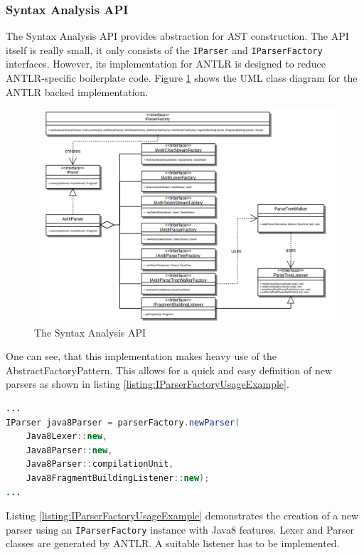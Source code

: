 \subsubsection{Syntax Analysis API}
\label{subsubsection:SyntaxAnalysisAPI}
The Syntax Analysis \gls{API} provides abstraction for \gls{AST} construction.
The \gls{API} itself is really small, it only consists of the \texttt{IParser} and \texttt{IParserFactory} interfaces.
However, its implementation for \gls{ANTLR} is designed to reduce \gls{ANTLR}-specific boilerplate code.
Figure \ref{figure:SyntaxAnalysisAPI} shows the \gls{UML} class diagram for the \gls{ANTLR} backed implementation.
\begin{figure}[h!]
\begin{center}
\includegraphics[width=\textwidth]{images/SyntaxAnalysisAPI.png}
\end{center}
\caption{The Syntax Analysis API}
\label{figure:SyntaxAnalysisAPI}
\end{figure}
One can see, that this implementation makes heavy use of the \gls{AbstractFactoryPattern}.
This allows for a quick and easy definition of new parsers as shown in listing \ref{listing:IParserFactoryUsageExample}.
\begin{lstlisting}[language=Java,caption={IParserFactory Usage Example},label={listing:IParserFactoryUsageExample}]
...
IParser java8Parser = parserFactory.newParser(
	Java8Lexer::new,
	Java8Parser::new, 
	Java8Parser::compilationUnit, 
	Java8FragmentBuildingListener::new);
...
\end{lstlisting}
Listing \ref{listing:IParserFactoryUsageExample} demonstrates the creation of a new parser using an \texttt{IParserFactory} instance with \gls{Java}8 features.
Lexer and Parser classes are generated by \gls{ANTLR}.
A suitable listener has to be implemented.


